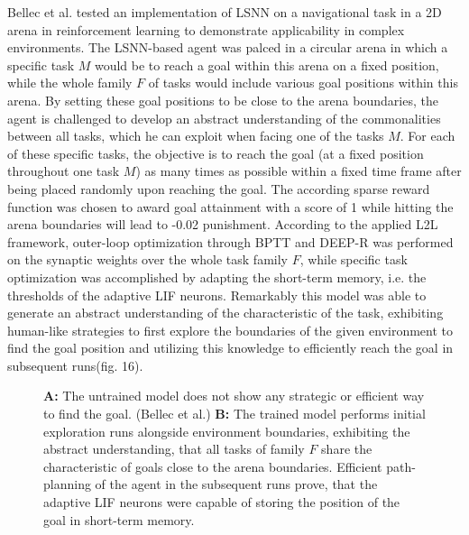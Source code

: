 \documentclass[letterpaper, 10 pt, conference]{ieeeconf}  %
\begin{document}
Bellec et al.\cite{bellecLongShorttermMemory2018} tested an implementation of LSNN on a navigational task in a 
2D arena in reinforcement learning to demonstrate applicability in 
complex environments. The LSNN-based agent was palced in a circular arena in which a specific task $M$ would be to reach a goal within this arena
on a fixed position, while the whole family $F$ of tasks would include various goal positions within this arena. By setting these goal positions 
to be close to the arena boundaries, the agent is challenged to develop an abstract understanding of the commonalities between all tasks, 
which he can exploit when facing one of the tasks $M$. For each of these specific tasks, the objective is 
to reach the goal (at a fixed position throughout one task $M$) as many times as possible within a fixed time frame after being placed randomly
upon reaching the goal. The according sparse reward function was chosen to award goal attainment with a score of 1 while hitting the arena
boundaries will lead to -0.02 punishment. According to the applied L2L framework, outer-loop optimization through BPTT and DEEP-R was performed on the
synaptic weights over the whole task family $F$, while specific task optimization was accomplished by 
adapting the short-term memory, i.e. the thresholds of the adaptive LIF neurons. Remarkably this model was able to generate an abstract understanding
of the characteristic of the task, exhibiting human-like strategies to first explore the boundaries of the given environment to find the goal 
position and utilizing this knowledge to efficiently reach the goal in subsequent runs(fig. 16). 
\begin{figure}[thpb]
        \centering
\caption{\textbf{A:} The untrained model does not show any strategic or efficient way to find the goal. (Bellec et al.) \newline
\textbf{B:} The trained model performs initial exploration runs alongside environment boundaries, exhibiting the abstract understanding,
that all tasks of family $F$ share the characteristic of goals close to the arena boundaries. Efficient path-planning of the agent 
in the subsequent runs prove, that the adaptive LIF neurons were capable of storing the position of the goal in short-term memory. 
\cite{bellecLongShorttermMemory2018}}
        \label{figurelabel}
        \end{figure}
        
\end{document}
